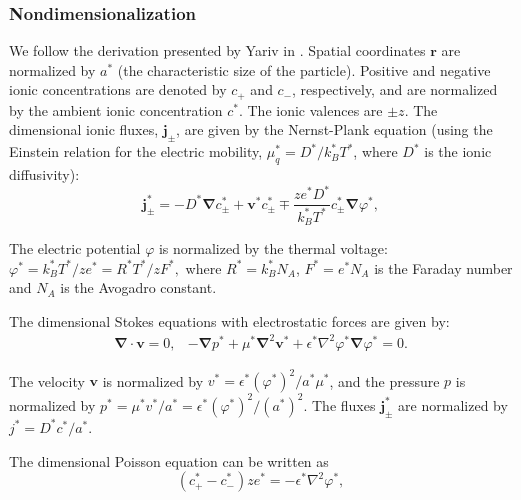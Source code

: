 \documentclass[preprint,10pt]{elsarticle}
\newcommand\eps \epsilon
\newcommand\Laplacian{\nabla^2}
\newcommand\bnabla{\boldsymbol{\nabla}}
\newcommand\bLaplacian{\boldsymbol{\nabla}^2}
\newcommand\bv{\boldsymbol{v}}
\newcommand\bj{\boldsymbol{j}}
\newcommand\br{\boldsymbol{r}}
\begin{document}
\subsubsection{Nondimensionalization}
We follow the derivation presented by Yariv in \cite{yariv2010asymptotic}.
Spatial coordinates $\br$ are normalized by $a^*$ 
(the characteristic size of the particle).
Positive and negative ionic concentrations are denoted by $c_+$ and $c_-$, respectively, and
are normalized by the ambient ionic concentration $c^*$. The ionic valences are $\pm z$.
The dimensional ionic fluxes, $\bj_\pm$, are given by the Nernst-Plank equation 
(using the Einstein relation for the electric mobility, $\mu_q^* = D^* / k_B^* T^*$, 
where $D^*$ is the ionic diffusivity):
\begin{equation}
\bj^*_\pm = 
-D^* \bnabla c^*_\pm + \bv^* c^*_\pm \mp \frac{z e^* D^*}{k_B^* T^*} c^*_\pm \bnabla \varphi^*,
\end{equation}

The electric potential $\varphi$ is normalized by the thermal voltage:
$\varphi^* = {k_B^* T^*}/{z e^*} = {R^* T^*}/{z F^*},$
where $R^* = k_B^* N_A$, $F^* = e^* N_A$ is the Faraday number and $N_A$ is the Avogadro constant.

The dimensional Stokes equations with electrostatic forces are given by:
\begin{equation} \begin{array}{cc}
\bnabla \cdot \bv = 0, &
-\bnabla p^* + \mu^* \bLaplacian \bv^* + \eps^* \Laplacian \varphi^* 
\bnabla \varphi^* = 0.
\end{array}\end{equation}

The velocity $\bv$ is normalized by $v^* = {\eps^* (\varphi^*)^2}/{a^* \mu^*}$,
and the pressure $p$ is normalized by $p^* = {\mu^* v^*}/{a^*} = {\eps^* (\varphi^*)^2}/{(a^*)^2}$.
The fluxes $\bj^*_\pm$ are normalized by $j^* = {D^* c^*}/{a^*}$.

The dimensional Poisson equation can be written as
\begin{equation}
(c^*_+ - c^*_-) z e^* = -\eps^* \Laplacian \varphi^*,
\end{equation}
\end{document}
